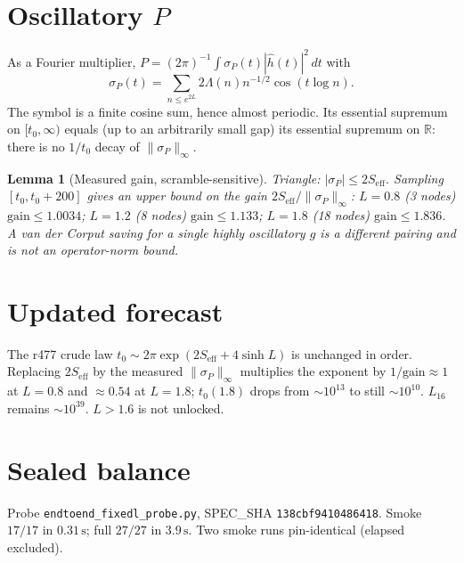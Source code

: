 \documentclass[11pt]{article}
\newtheorem{lemma}{Lemma}
\theoremstyle{remark}
\begin{document}
\section{Oscillatory $P$}

As a Fourier multiplier,
$P=(2\pi)^{-1}\int\sigma_P(t)|\hat h(t)|^2\,dt$ with
\[
\sigma_P(t)=\sum_{n\le e^{2L}}2\Lambda(n)n^{-1/2}\cos(t\log n).
\]
The symbol is a finite cosine sum, hence almost periodic.
Its essential supremum on $[t_0,\infty)$ equals (up to an
arbitrarily small gap) its essential supremum on $\mathbb R$:
there is no $1/t_0$ decay of $\|\sigma_P\|_\infty$.

\begin{lemma}[Measured gain, scramble-sensitive]\label{lem:C}
Triangle: $|\sigma_P|\le 2S_{\mathrm{eff}}$.
Sampling $[t_0,t_0+200]$ gives an \emph{upper} bound on the
gain $2S_{\mathrm{eff}}/\|\sigma_P\|_\infty$:
$L=0.8$ (3 nodes) $\mathrm{gain}\le1.0034$;
$L=1.2$ (8 nodes) $\mathrm{gain}\le1.133$;
$L=1.8$ (18 nodes) $\mathrm{gain}\le1.836$.
A van der Corput saving for a single highly oscillatory $g$
is a different pairing and is not an operator-norm bound.
\end{lemma}

\section{Updated forecast}

The r477 crude law
$t_0\sim2\pi\exp(2S_{\mathrm{eff}}+4\sinh L)$
is unchanged in order.
Replacing $2S_{\mathrm{eff}}$ by the measured
$\|\sigma_P\|_\infty$ multiplies the exponent by
$1/\mathrm{gain}\approx1$ at $L=0.8$ and $\approx0.54$ at $L=1.8$;
$t_0(1.8)$ drops from $\sim10^{13}$ to still $\sim10^{10}$.
$L_{16}$ remains $\sim10^{39}$.  $L>1.6$ is not unlocked.

\section{Sealed balance}

Probe \texttt{endtoend\_fixedl\_probe.py},
SPEC\_SHA \texttt{138cbf9410486418}.
Smoke $17/17$ in $0.31\,\mathrm{s}$; full $27/27$ in $3.9\,\mathrm{s}$.
Two smoke runs pin-identical (elapsed excluded).
\end{document}
